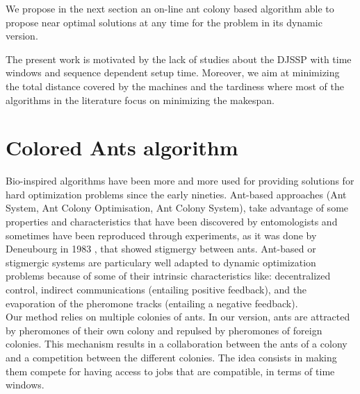 \documentclass[a4paper,10pt]{article}
\begin{document}

We propose in the next section an on-line ant colony based algorithm able to propose near optimal solutions at any time for the problem in its dynamic version.

The present work is motivated by the lack of studies about the DJSSP with time windows and sequence dependent setup time. Moreover, we aim at minimizing the total distance covered by the machines and the tardiness where  most of the algorithms in the literature focus on minimizing the makespan.

\section{Colored Ants algorithm}\label{sec:ants}

Bio-inspired algorithms have been more and more used for providing solutions for hard optimization problems since the early nineties\cite{Dorigo2006}. Ant-based approaches (Ant System, Ant Colony Optimisation, Ant Colony System), take advantage of some properties and characteristics that have been discovered by entomologists and sometimes have been reproduced through experiments, as it was done by Deneubourg in 1983 \cite{Deneubourg1983}, that showed stigmergy between ants. Ant-based or stigmergic systems are particulary well adapted to dynamic optimization problems because of some of their intrinsic characteristics like: decentralized control, indirect communications (entailing positive feedback), and the evaporation of the pheromone tracks (entailing a negative feedback).\\

Our method relies on multiple colonies of ants. In our version, ants are attracted by pheromones of their own colony and repulsed by pheromones of foreign colonies. This mechanism results in a collaboration between the ants of a colony and a competition between the different colonies. The idea consists in making them compete for having access to jobs that are compatible, in terms of time windows.\\
\end{document}
